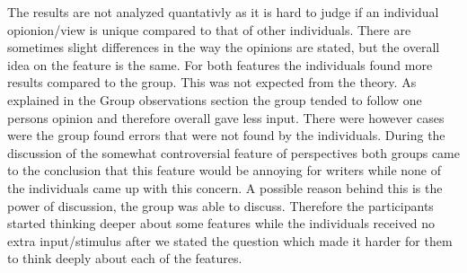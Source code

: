 \documentclass[main.tex]{subfiles}
\begin{document}
The results are not analyzed quantativly as it is hard to judge if an individual opionion/view is unique compared to that of other individuals. There are sometimes slight differences in the way the opinions are stated, but the overall idea on the feature is the same. For both features the individuals found more results compared to the group. This was not expected from the theory. As explained in the Group observations section the group tended to follow one persons opinion and therefore overall gave less input. There were however cases were the group found errors that were not found by the individuals. During the discussion of the somewhat controversial feature of perspectives both groups came to the conclusion that this feature would be annoying for writers while none of the individuals came up with this concern. A possible reason behind this is the power of discussion, the group was able to discuss. Therefore the participants started thinking deeper about some features while the individuals received no extra input/stimulus after we stated the question which made it harder for them to think deeply about each of the features.
\end{document}

